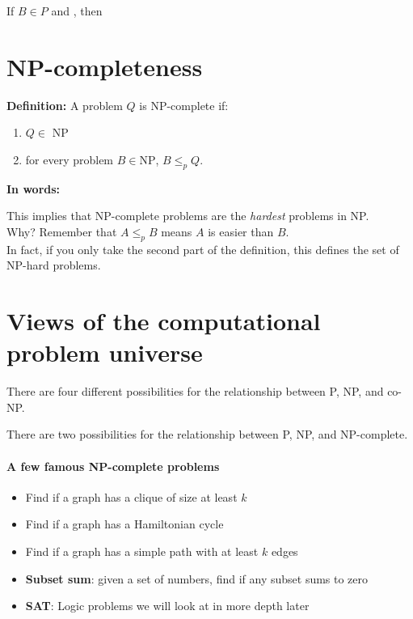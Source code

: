 \documentclass[11  pt]{article}
\begin{document}
	\begin{lemma} 
		If $B \in P$ and , then 
	\end{lemma}	
	
	\newpage
	
	
	\section{NP-completeness}
	
	\textbf{Definition: } A problem $Q$ is NP-complete if:
	\begin{enumerate}
		\item $Q \in$ NP
		\item for every problem $B \in \text{NP}$, $B \leq_p Q$. \\
	\end{enumerate}
	
	\textbf{In words:} \\ %
	
	
	\vs{8cm}
	
	This implies that NP-complete problems are the \emph{hardest} problems in NP. \\
	
	
	Why? Remember that $A \leq_p B$ means $A$ is easier than $B$. \\
	
	In fact, if you only take the second part of the definition, this defines the set of NP-hard problems.
	
	
	\newpage
	
	\section{Views of the computational problem universe}
	There are four different possibilities for the relationship between P, NP, and co-NP.
	
	
	
	\vfill
	
	There are two possibilities for the relationship between P, NP, and NP-complete.
	
	\vfill
	
	\newpage
	
	\paragraph{A few famous NP-complete problems}
	\begin{itemize}
		\item Find if a graph has a clique of size at least $k$
		\item Find if a graph has a Hamiltonian cycle
		\item Find if a graph has a simple path with at least $k$ edges
		\item \textbf{Subset sum}: given a set of numbers, find if any subset sums to zero
		\item \textbf{SAT}: Logic problems we will look at in more depth later
	\end{itemize}
	
\end{document}
